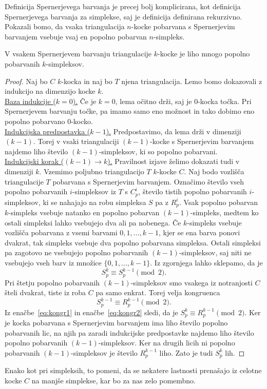 \documentclass[mat1]{fmfdelo}
\newcommand{\0}{\underline{0}}
\begin{document}
Definicija Spernerjevega barvanja je precej bolj komplicirana, kot definicija Spernerjevega barvanja za simplekse, saj je definicija \label{def:cubsperner} definirana rekurzivno.
Pokazali bomo, da vsaka triangulacija $n$-kocke pobarvana s Spernerjevim barvanjem vsebuje vsaj en popolno pobarvan $n$-simpleks.
\begin{lema}\label{izr:kubsperner}
V vsakem Spernerjevem barvanju triangulacije $k$-kocke je liho mnogo popolno pobarvanih $k$-simpleksov.
\end{lema}
\begin{proof}
Naj bo $C$ $k$-kocka in naj bo $T$ njena triangulacija. Lemo bomo dokazovali z indukcijo na dimenzijo kocke $k$. \\
\underline{Baza indukcije ($k = 0$).}
Če je $k=0$, lema očitno drži, saj je $0$-kocka točka. Pri Spernerjevem barvanju točke, pa imamo samo eno možnost in tako dobimo eno popolno pobarvano $0$-kocko.\\
\underline{Indukcijska predpostavka ($k - 1$).}
Predpostavimo, da lema drži v dimenziji $(k - 1)$. Torej v vsaki triangulaciji $(k - 1)$-kocke s Spernerjevim barvanjem najdemo liho število $(k - 1)$-simpleksov, ki so popolno pobarvani. \\
\underline{Indukcijski korak ($(k - 1) \rightarrow k$).}
Pravilnost izjave želimo dokazati tudi v dimenziji $k$. Vzemimo poljubno triangulacijo $T$ $k$-kocke $C$. Naj bodo vozlišča triangulacije $T$ pobarvana s Spernerjevim barvanjem. Označimo število vseh popolno pobarvanih $i$-simpleksov iz $T$ s $C_p^i$, število tistih popolno pobarvanih $i$-simpleksov, ki se nahajajo na robu simpleksa $S$ pa z $R_p^i$. Vsak popolno pobarvan $k$-simpleks vsebuje natanko en popolno pobarvan $(k-1)$-simpleks, medtem ko ostali simpleksi lahko vsebujejo dva ali pa nobenega. Če $k$-simpleks vsebuje vozlišča pobarvana z vsemi barvami $0, 1, \dots, k-1$, kjer se ena barva ponovi dvakrat, tak simpleks vsebuje dva popolno pobarvana simpleksa. Ostali simpleksi pa zagotovo ne vsebujejo popolno pobarvanih $(k - 1)$-simpleksov, saj niti ne vsebujejo vseh barv iz množice $\{0, 1, \dots, k-1 \}$. Iz zgornjega lahko sklepamo, da je
\begin{equation}\label{eq:kongr1}
S_p^k \equiv S_p^{k-1} \pmod 2.
\end{equation}
Pri štetju popolno pobarvanih $(k - 1)$-simpleksov smo vsakega iz notranjosti $C$ šteli dvakrat, tiste iz roba $C$ pa samo enkrat. Torej velja kongruenca 
\begin{equation}\label{eq:kongr2}
S_p^{k-1} \equiv R_p^{k - 1} \pmod 2.
\end{equation}
Iz enačbe~\ref{eq:kongr1} in enačbe~\ref{eq:kongr2} sledi, da je $S_p^k \equiv R_p^{k - 1} \pmod 2$.
Ker je kocka pobarvana s Spernerjevim barvanjem ima liho število popolno pobarvanih lic, na njih pa zaradi indukcijske predpostavke najdemo liho število popolno pobarvanih $(k - 1)$-simpleksov. Ker na drugih licih ni popolno pobarvanih $(k - 1)$-simpleksov je število $R_p^{k - 1}$ liho. Zato je tudi $S_p^k$ lih.
\end{proof}
Enako kot pri simpleksih, to pomeni, da se nekatere lastnosti prenašajo iz celotne kocke $C$ na manjše simplekse, kar bo za nas zelo pomembno.
\end{document}
